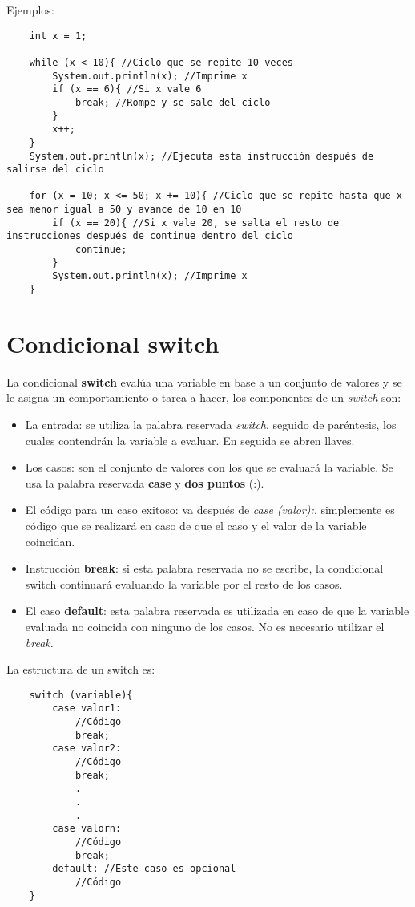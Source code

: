 Ejemplos:
\begin{lstlisting}
    int x = 1;
    
    while (x < 10){ //Ciclo que se repite 10 veces
        System.out.println(x); //Imprime x
        if (x == 6){ //Si x vale 6
            break; //Rompe y se sale del ciclo
        }
        x++;
    }  
    System.out.println(x); //Ejecuta esta instrucción después de salirse del ciclo
    
    for (x = 10; x <= 50; x += 10){ //Ciclo que se repite hasta que x sea menor igual a 50 y avance de 10 en 10
        if (x == 20){ //Si x vale 20, se salta el resto de instrucciones después de continue dentro del ciclo
            continue;
        }
        System.out.println(x); //Imprime x
    }
\end{lstlisting}



\section{Condicional switch}
\hspace{0.55cm}La condicional \textbf{switch} evalúa una variable en base a un conjunto de valores y se le asigna un comportamiento o tarea a hacer, los componentes de un \textit{switch} son:
\begin{itemize}
    \item La entrada: se utiliza la palabra reservada \textit{switch}, seguido de paréntesis, los cuales contendrán la variable a evaluar. En seguida se abren llaves.
    \item Los casos: son el conjunto de valores con los que se evaluará la variable. Se usa la palabra reservada \textbf{case} y \textbf{dos puntos} (:).
    \item El código para un caso exitoso: va después de \textit{case (valor):}, simplemente es código que se realizará en caso de que el caso y el valor de la variable coincidan.
    \item Instrucción \textbf{break}: si esta palabra reservada no se escribe, la condicional switch continuará evaluando la variable por el resto de los casos.
    \item El caso \textbf{default}: esta palabra reservada es utilizada en caso de que la variable evaluada no coincida con ninguno de los casos. No es necesario utilizar el \textit{break}.
\end{itemize}

La estructura de un switch es:
\begin{lstlisting}
    switch (variable){
        case valor1:
            //Código
            break;
        case valor2:
            //Código
            break;
            .
            .
            .
        case valorn:
            //Código
            break;
        default: //Este caso es opcional
            //Código
    }
\end{lstlisting}


